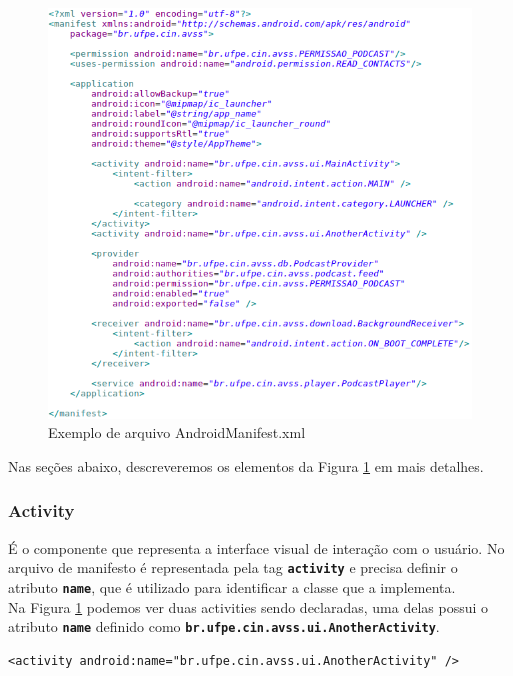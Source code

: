 \documentclass[a4paper,12pt]{article}
\begin{document}
 \begin{figure}[h]
 \centering
 \includegraphics[width=\linewidth]{imgs/manifest.png}
 \caption{Exemplo de arquivo AndroidManifest.xml}
 \label{fig:manifest}
 \end{figure}

Nas seções abaixo, descreveremos os elementos da Figura \ref{fig:manifest} em mais detalhes.\\


\subsubsection{Activity}
É o componente que representa a interface visual de interação com o usuário. No arquivo de manifesto é representada pela tag {\small\texttt{\textbf{activity}}} e precisa definir o atributo {\small\texttt{\textbf{name}}}, que é utilizado para identificar a classe que a implementa.\\

Na Figura \ref{fig:manifest} podemos ver duas activities sendo declaradas, uma delas possui o atributo {\small\texttt{\textbf{name}}} definido como {\small\texttt{\textbf{br.ufpe.cin.avss.ui.AnotherActivity}}}.
{\fontsize{9pt}{12pt}
\begin{Verbatim}
<activity android:name="br.ufpe.cin.avss.ui.AnotherActivity" />
\end{Verbatim}
}
\end{document}
